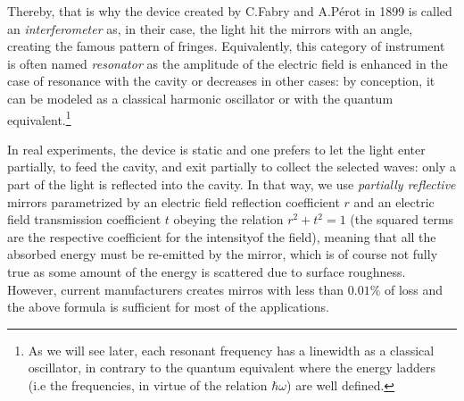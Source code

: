 \documentclass[10pt]{report}
\begin{document}
Thereby, that is why the device created by C.Fabry and A.Pérot in 1899 is called an \textit{interferometer} as, in their case, the light hit the mirrors with an angle, creating the famous pattern of fringes. Equivalently, this category of instrument is often named \textit{resonator} as the amplitude of the electric field is enhanced in the case of resonance with the cavity or decreases in other cases: by conception, it can be modeled as a classical harmonic oscillator or with the quantum equivalent.\footnote{As we will see later, each resonant frequency has a linewidth as a classical oscillator, in contrary to the quantum equivalent where the energy ladders (i.e the frequencies, in virtue of the relation $ \hbar \omega$) are well defined.}

In real experiments, the device is static and one prefers to let the light enter partially, to feed the cavity, and exit partially to collect the selected waves: only a part of the light is reflected into the cavity. In that way, we use \textit{partially reflective} mirrors parametrized by an electric field reflection coefficient $r$ and an electric field transmission coefficient $t$ obeying the relation $r^2 + t^2 = 1$ (the squared terms are the respective coefficient for the intensityof the field), meaning that all the absorbed energy must be re-emitted by the mirror, which is of course not fully true as some amount of the energy is scattered due to surface roughness. However, current manufacturers creates mirros with less than $0.01\%$ of loss and the above formula is sufficient for most of the applications.
\end{document}
